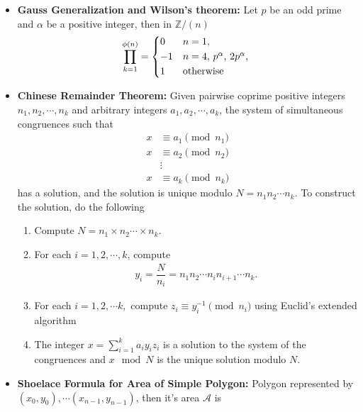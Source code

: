 \documentclass[15pt,a4paper]{article}
\begin{document}
\begin{landscape}
\begin{multicols*}{3}
\begin{itemize}
\begin{itemize}
        \end{itemize}
    \item \textbf{Gauss Generalization and Wilson's theorem: } Let $p$ be an odd prime and $\alpha$ be a positive integer, then in $\mathbb{Z}/(n)$
        \begin{equation*}
            \prod_{k = 1}^{\phi(n)} = 
                \begin{cases*}
                    0 & $n = 1$,\\
                    -1 & $n = 4$, $p^{\alpha}$, $2p^{\alpha}$, \\
                    1 & otherwise
                \end{cases*}
        \end{equation*}
    
    \item \textbf{Chinese Remainder Theorem:} Given pairwise coprime positive integers $n_1, n_2, \cdots, n_k$ and arbitrary integers $a_1, a_2, \cdots, a_k$, the system of simultaneous congruences such that
        \begin{align*}
            x &\equiv a_1 \pmod{n_1}\\
            x &\equiv a_2 \pmod{n_2}\\
              &\vdots\\
            x &\equiv a_k \pmod{n_k}
        \end{align*}
    has a solution, and the solution is unique modulo $N = n_1n_2\cdots n_k$.
    To construct the solution, do the following
        \begin{enumerate}
            \item Compute $N = n_1 \times n_2 \cdots \times n_k$.
            \item For each $i = 1, 2,\cdots,k$, compute
                \begin{align*}
                    y_i = \dfrac{N}{n_i} = n_1n_2\cdots n_in_{i + 1}\cdots n_k.
                \end{align*}
            \item For each $i = 1, 2, \cdots k,$ compute $z_i \equiv y_i^{-1} \pmod n_i$ using Euclid's extended algorithm
            \item The integer $x = \sum_{i = 1}^{k} a_iy_iz_i$ is a solution to the system of the congruences and $x \mod{N}$ is the unique solution modulo $N$.
        \end{enumerate}
    \item \textbf{Shoelace Formula for Area of Simple Polygon:} Polygon represented by $(x_0, y_0), \cdots (x_{n - 1}, y_{n - 1})$, then it's area $\mathcal{A}$ is

\end{itemize}
\end{multicols*}
\end{landscape}
\end{document}
